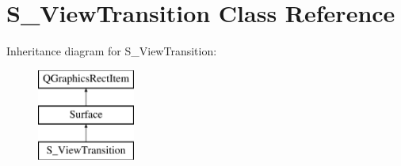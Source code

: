 \hypertarget{class_s___view_transition}{}\section{S\+\_\+\+View\+Transition Class Reference}
\label{class_s___view_transition}
Inheritance diagram for S\+\_\+\+View\+Transition\+:\begin{figure}[H]
\begin{center}
\leavevmode
\includegraphics[height=3.000000cm]{class_s___view_transition}
\end{center}
\end{figure}
